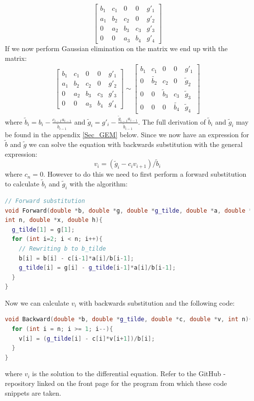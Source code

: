 \documentclass[a4paper, english]{amsart} %
\begin{document}
\begin{equation*}
\begin{bmatrix}
b_1 & c_1 & 0 & 0 & g'_1 \\
a_1 & b_2 & c_2 & 0 & g'_2 \\
0 & a_2 & b_3 & c_3 & g'_3 \\
0 & 0 & a_3 & b_4 & g'_4
\end{bmatrix}
\end{equation*}
If we now perform Gaussian elimination on the matrix we end up with the matrix:
\begin{eqnarray*}
&
\begin{bmatrix}
b_1 & c_1 & 0 & 0 & g'_1 \\
a_1 & b_2 & c_2 & 0 & g'_2 \\
0 & a_2 & b_3 & c_3 & g'_3 \\
0 & 0 & a_3 & b_4 & g'_4
\end{bmatrix} \sim
\begin{bmatrix}
b_1 & c_1 & 0 & 0 & g'_1\\
0 & \tilde{b_2} & c_2 & 0 & \tilde{g}_2 \\ 
0 & 0 & \tilde{b}_3 & c_3 & \tilde{g}_3 \\
0 & 0 & 0 & \tilde{b_4} & \tilde{g}_4
\end{bmatrix}&
\end{eqnarray*}
where $\displaystyle \tilde{b}_i = b_i - \frac{c_{i-1}a_{i-1}}{\tilde{b}_{i-1}}$ and $\displaystyle \tilde{g}_i = g'_i - \frac{\tilde{g}_{i-1}a_{i-1}}{\tilde{b}_{i-1}}$. The full derivation of $\tilde{b}_i$ and $\tilde{g}_i$ may be found in the appendix \ref{Sec_GEM} below. Since we now have an expression for $\tilde{b}$ and $\tilde{g}$ we can solve the equation with backwards substitution with the general expression: 
\begin{equation*}
v_{i} = (\tilde{g}_{i} - c_{i}v_{i+1})/\tilde{b}_i
\end{equation*}
where $c_n = 0$. However to do this we need to first perform a forward substitution to calculate $\tilde{b}_i$ and $\tilde{g}_i$ with the algorithm:

\begin{lstlisting}[language=C++, caption={Forward Substitution}]
// Forward substitution
void Forward(double *b, double *g, double *g_tilde, double *a, double *c, 
int n, double *x, double h){
  g_tilde[1] = g[1];
  for (int i=2; i < n; i++){
    // Rewriting b to b_tilde
    b[i] = b[i] - c[i-1]*a[i]/b[i-1];
    g_tilde[i] = g[i] - g_tilde[i-1]*a[i]/b[i-1];
  }
}
\end{lstlisting}
Now we can calculate $v_i$ with backwards substitution and the following code: 
\begin{lstlisting}[language=C++, caption={Backward Substitution}]
void Backward(double *b, double *g_tilde, double *c, double *v, int n){
  for (int i = n; i >= 1; i--){
    v[i] = (g_tilde[i] - c[i]*v[i+1])/b[i];
  }
}
\end{lstlisting}
where $v_i$ is the solution to the differential equation. Refer to the GitHub - repository linked on the front page for the program from which these code snippets are taken.\\
\end{document}
